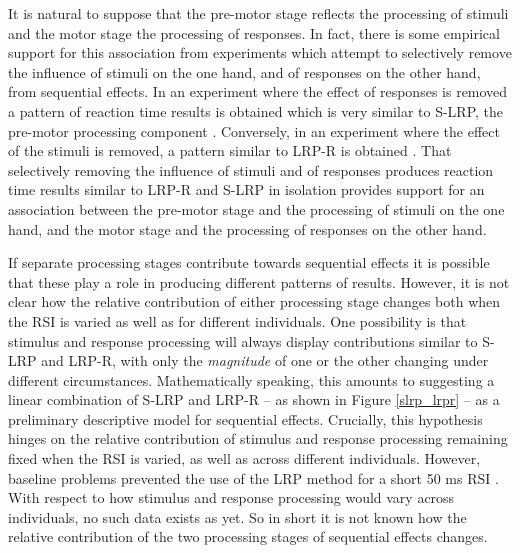 \documentclass{apa}[12pt]
\begin{document}

It is natural to suppose that the pre-motor stage reflects the processing of stimuli and the motor stage the processing of responses. In fact, there is some empirical support for this association from experiments which attempt to selectively remove the influence of stimuli on the one hand, and of responses on the other hand, from sequential effects. In an experiment where the effect of responses is removed a pattern of reaction time results is obtained which is very similar to S-LRP, the pre-motor processing component \cite{Maloney05}. Conversely, in an experiment where the effect of the stimuli is removed, a pattern similar to LRP-R is obtained \cite{Wilder13}. That selectively removing the influence of stimuli and of responses produces reaction time results similar to LRP-R and S-LRP in isolation provides support for an association between the pre-motor stage and the processing of stimuli on the one hand, and the motor stage and the processing of responses on the other hand.

If separate processing stages contribute towards sequential effects it is possible that these play a role in producing different patterns of results. However, it is not clear how the relative contribution of either processing stage changes both when the RSI is varied as well as for different individuals. One possibility is that stimulus and response processing will always display contributions similar to S-LRP and LRP-R, with only the \textit{magnitude} of one or the other changing under different circumstances. Mathematically speaking, this amounts to suggesting a linear combination of S-LRP and LRP-R -- as shown in Figure \ref{slrp_lrpr} -- as a preliminary descriptive model for sequential effects. Crucially, this hypothesis hinges on the relative contribution of stimulus and response processing remaining fixed when the RSI is varied, as well as across different individuals. However, baseline problems prevented the use of the LRP method for a short 50 ms RSI \cite{Jentzsch02}. With respect to how stimulus and response processing would vary across individuals, no such data exists as yet. So in short it is not known how the relative contribution of the two processing stages of sequential effects changes.
\end{document}

